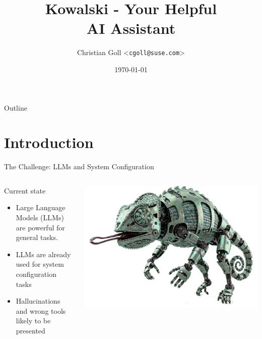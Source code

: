 \documentclass[aspectratio=169]{beamer}
\title{Kowalski - Your Helpful \\AI Assistant}
\author{Christian Goll <\texttt{cgoll@suse.com}>}
\date{\today}
\begin{document}
\begin{frame}
  \titlepage
\end{frame}

\begin{frame}{Outline}
  \tableofcontents
\end{frame}

\section{Introduction}
\begin{frame}[fragile]{The Challenge: LLMs and System Configuration}
\begin{columns}
  \begin{block}{Current state}
    \begin{itemize}
      \item Large Language Models (LLMs) are powerful for general tasks.
      \item LLMs are already used for system configuration tasks
      \item Hallucinations and wrong tools likely to be presented
    \end{itemize}
  \end{block}
  \includegraphics[width=\linewidth]{RobotChameleon}
\end{columns}
\end{frame}
\end{document}

